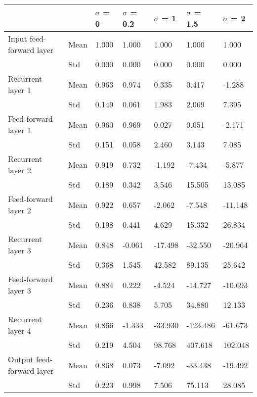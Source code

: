 \begin{tabular}{lllllll}
\toprule
                          &     & $\sigma$  = 0 & $\sigma$  = 0.2 & $\sigma$  = 1 & $\sigma$  = 1.5 & $\sigma$  = 2 \\
\midrule
Input feed-forward layer & Mean &         1.000 &           1.000 &         1.000 &           1.000 &         1.000 \\
                          & Std &         0.000 &           0.000 &         0.000 &           0.000 &         0.000 \\
Recurrent layer 1 & Mean &         0.963 &           0.974 &         0.335 &           0.417 &        -1.288 \\
                          & Std &         0.149 &           0.061 &         1.983 &           2.069 &         7.395 \\
Feed-forward layer 1 & Mean &         0.960 &           0.969 &         0.027 &           0.051 &        -2.171 \\
                          & Std &         0.151 &           0.058 &         2.460 &           3.143 &         7.085 \\
Recurrent layer 2 & Mean &         0.919 &           0.732 &        -1.192 &          -7.434 &        -5.877 \\
                          & Std &         0.189 &           0.342 &         3.546 &          15.505 &        13.085 \\
Feed-forward layer 2 & Mean &         0.922 &           0.657 &        -2.062 &          -7.548 &       -11.148 \\
                          & Std &         0.198 &           0.441 &         4.629 &          15.332 &        26.834 \\
Recurrent layer 3 & Mean &         0.848 &          -0.061 &       -17.498 &         -32.550 &       -20.964 \\
                          & Std &         0.368 &           1.545 &        42.582 &          89.135 &        25.642 \\
Feed-forward layer 3 & Mean &         0.884 &           0.222 &        -4.524 &         -14.727 &       -10.693 \\
                          & Std &         0.236 &           0.838 &         5.705 &          34.880 &        12.133 \\
Recurrent layer 4 & Mean &         0.866 &          -1.333 &       -33.930 &        -123.486 &       -61.673 \\
                          & Std &         0.219 &           4.504 &        98.768 &         407.618 &       102.048 \\
Output feed-forward layer & Mean &         0.868 &           0.073 &        -7.092 &         -33.438 &       -19.492 \\
                          & Std &         0.223 &           0.998 &         7.506 &          75.113 &        28.085 \\
\bottomrule
\end{tabular}
